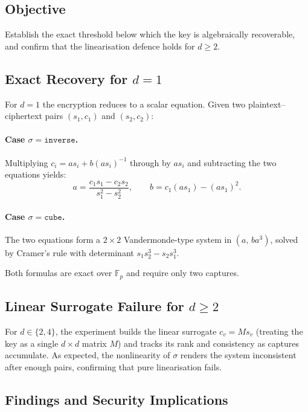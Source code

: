 \documentclass[12pt,a4paper]{article}
\theoremstyle{definition}
\newcommand{\Fp}{\mathbb{F}_p}
\begin{document}
\subsection{Objective}

Establish the exact threshold below which the key is algebraically
recoverable, and confirm that the linearisation defence holds for
$d \geq 2$.

\subsection{Exact Recovery for $d = 1$}

For $d = 1$ the encryption reduces to a scalar equation. Given two
plaintext--ciphertext pairs $(s_1, c_1)$ and $(s_2, c_2)$:

\paragraph{Case $\sigma = \texttt{inverse}$.}
Multiplying $c_i = a s_i + b(as_i)^{-1}$ through by $as_i$ and
subtracting the two equations yields:
\begin{equation}
  a = \frac{c_1 s_1 - c_2 s_2}{s_1^2 - s_2^2}, \qquad
  b = c_1(as_1) - (as_1)^2.
\end{equation}

\paragraph{Case $\sigma = \texttt{cube}$.}
The two equations form a $2\times 2$ Vandermonde-type system in
$(a,\, ba^3)$, solved by Cramer's rule with determinant
$s_1 s_2^3 - s_2 s_1^3$.

Both formulas are exact over $\Fp$ and require only two captures.

\subsection{Linear Surrogate Failure for $d \geq 2$}

For $d \in \{2, 4\}$, the experiment builds the linear surrogate
$c_v = M s_v$ (treating the key as a single $d\times d$ matrix $M$)
and tracks its rank and consistency as captures accumulate. As
expected, the nonlinearity of $\sigma$ renders the system
inconsistent after enough pairs, confirming that pure linearisation
fails.

\subsection{Findings and Security Implications}
\end{document}
